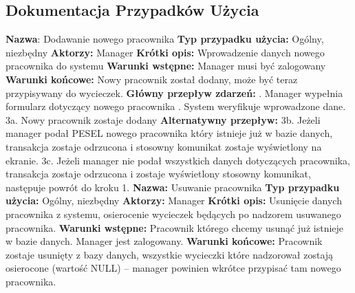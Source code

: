 \documentclass[polish,polish,a4paper]{article}
\begin{document}
\subsection{Dokumentacja Przypadków Użycia}
\textbf{Nazwa}: Dodawanie nowego pracownika \newline
\textbf{Typ przypadku użycia:} Ogólny, niezbędny \newline
\textbf{Aktorzy:} Manager \newline
\textbf{Krótki opis:} Wprowadzenie danych nowego pracownika do systemu \newline
\textbf{Warunki wstępne:} Manager musi być zalogowany \newline
\textbf{Warunki końcowe:} Nowy pracownik został dodany, może być teraz przypisywany do wycieczek. \newline
\textbf{Główny przepływ zdarzeń:} . Manager wypełnia formularz dotyczący nowego pracownika . System weryfikuje wprowadzone dane. \newline
3a. Nowy pracownik zostaje dodany \newline
\textbf{Alternatywny przepływ:} \newline
3b. Jeżeli manager podał PESEL nowego pracownika który istnieje już w bazie danych, transakcja
zostaje odrzucona i stosowny komunikat zostaje wyświetlony na ekranie. \newline
3c. Jeżeli manager nie podał wszystkich danych dotyczących pracownika, transakcja zostaje
odrzucona i zostaje wyświetlony stosowny komunikat, następuje powrót do kroku 1. \newline
 \newline
\textbf{Nazwa:} Usuwanie pracownika\newline
\textbf{Typ przypadku użycia:} Ogólny, niezbędny\newline
\textbf{Aktorzy:} Manager\newline
\textbf{Krótki opis:} Usunięcie danych pracownika z systemu, osierocenie wycieczek będących po nadzorem
usuwanego pracownika.\newline
\textbf{Warunki wstępne:} Pracownik którego chcemy usunąć już istnieje w bazie danych. Manager jest
zalogowany.\newline
\textbf{Warunki końcowe:} Pracownik zostaje usunięty z bazy danych, wszystkie wycieczki które nadzorował
zostają osierocone (wartość NULL) – manager powinien wkrótce przypisać tam nowego pracownika.\newline
\end{document}
